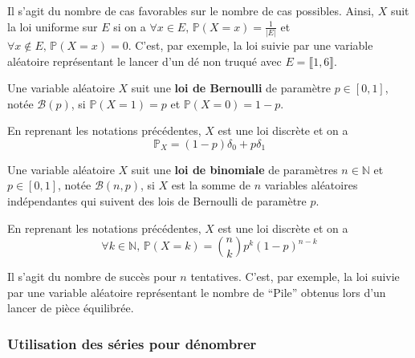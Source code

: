 	\begin{remark}
		Il s'agit du nombre de cas favorables sur le nombre de cas possibles. Ainsi, $X$ suit la loi uniforme sur $E$ si on a $\forall x \in E, \, \mathbb{P}(X=x) = \frac{1}{\vert E \vert}$ et $\forall x \notin E, \, \mathbb{P}(X=x) = 0$.
		\newpar
		C'est, par exemple, la loi suivie par une variable aléatoire représentant le lancer d'un dé non truqué avec $E = \llbracket 1, 6 \rrbracket$.
	\end{remark}
	
	\begin{definition}
		Une variable aléatoire $X$ suit une \textbf{loi de Bernoulli} de paramètre $p \in [0,1]$, notée $\mathcal{B}(p)$, si $\mathbb{P}(X=1) = p$ et $\mathbb{P}(X=0)=1-p$.
	\end{definition}
	
	\begin{proposition}
		En reprenant les notations précédentes, $X$ est une loi discrète et on a
		\[ \mathbb{P}_X = (1-p) \delta_0 + p \delta_1 \]
	\end{proposition}
	
	\begin{definition}
		Une variable aléatoire $X$ suit une \textbf{loi de binomiale} de paramètres $n \in \mathbb{N}$ et $p \in [0,1]$, notée $\mathcal{B}(n, p)$, si $X$ est la somme de $n$ variables aléatoires indépendantes qui suivent des lois de Bernoulli de paramètre $p$.
	\end{definition}
	
	\begin{proposition}
		En reprenant les notations précédentes, $X$ est une loi discrète et on a
		\[ \forall k \in \mathbb{N}, \, \mathbb{P}(X = k) = \binom{n}{k} p^k (1-p)^{n-k} \]
	\end{proposition}
	
	\begin{remark}
		Il s'agit du nombre de succès pour $n$ tentatives.
		\newpar
		C'est, par exemple, la loi suivie par une variable aléatoire représentant le nombre de ``Pile'' obtenus lors d'un lancer de pièce équilibrée.
	\end{remark}
	
	\newpage
	
	\subsubsection{Utilisation des séries pour dénombrer}
	
	
